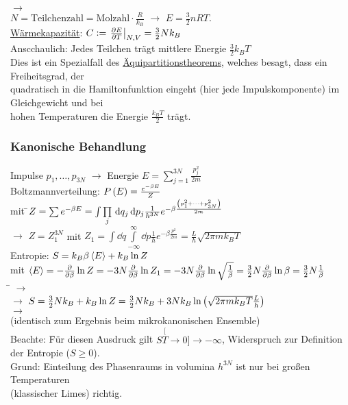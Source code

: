 \begin{tabbing}
$\rightarrow$\> \\
$N=\text{Teilchenzahl} = \text{Molzahl}\cdot \frac{R}{k_B}$ $\rightarrow$ $E = \frac32 n R T$.\\
\uline{Wärmekapazität}: $C \vcentcolon = \left. \frac{\partial E}{\partial T}\right\rvert_{N,V} = \frac32 N k_B$\\
Anscchaulich: Jedes Teilchen trägt mittlere Energie $\frac32 k_B T$\\
Dies ist ein Spezialfall des \uline{Äquipartitionstheorems}, welches besagt, dass ein Freiheitsgrad, der\\ quadratisch in die Hamiltonfunktion eingeht (hier jede Impulskomponente) im Gleichgewicht und bei\\ hohen Temperaturen die Energie $\frac{k_B T}{2}$ trägt.
\end{tabbing}

\subsubsection{Kanonische Behandlung}
\label{sec:Kanbeh}
\begin{tabbing}
Impulse $p_1, \dots ,p_{3N}$ $\rightarrow$ Energie $E = \sum\limits_{j=1}^{3N} \frac{p_j^2}{2 m}$\\
Boltzmannverteilung: $P\left( E \right) = \frac{e^{-\beta E}}{Z}$\\
mit \=$Z = \sum e^{-\beta E} = \int \prod\limits_j \,\text d{q_j}\,\text d{p_j} \frac{1}{h^{3N}} e^{-\beta\frac{\left( p_1^2 + \dots + p_{3N}^2 \right)}{2 m}}$\\
$\rightarrow$\> $Z = Z_1^{3N}$ mit $Z_1 = \int\dd{q}\int\limits_{-\infty}^\infty \dd{p} \frac{1}{h} e^{-\beta\frac{p^2}{2 m}} = \frac{L}{h} \sqrt{2\pi m k_B T}$\\
Entropie: $S = k_B \beta \left\langle E \right\rangle + k_B \ln Z$\\
mit $\left\langle E \right\rangle=-\frac{\partial }{\partial \beta} \ln Z=-3N \frac{\partial }{\partial \beta} \ln Z_1=-3N \frac{\partial }{\partial \beta} \ln \sqrt{\frac{1}{\beta}}=\frac32 N \frac{\partial }{\partial \beta}\ln\beta=\frac32 N \frac{1}{\beta}$\\
\hspace{4em} \= \kill
$\rightarrow$\> \\
$\rightarrow$\> $S = \frac32 N k_B + k_B \ln Z = \frac32 N k_B + 3 N k_B \ln\left( \sqrt{2\pi m k_B T}\frac{L}{h} \right)$\\
$\rightarrow$\> \\
(identisch zum Ergebnis beim mikrokanonischen Ensemble)\\
Beachte: \=Für diesen Ausdruck gilt $S\stackrel[T\to 0]{}{\to} -\infty$, Widerspruch zur Definition der Entropie ($S\geq 0$).\\\> Grund: Einteilung des Phasenraums in volumina $h^{3N}$ ist nur bei großen Temperaturen\\\> (klassischer Limes) richtig.
\end{tabbing}

